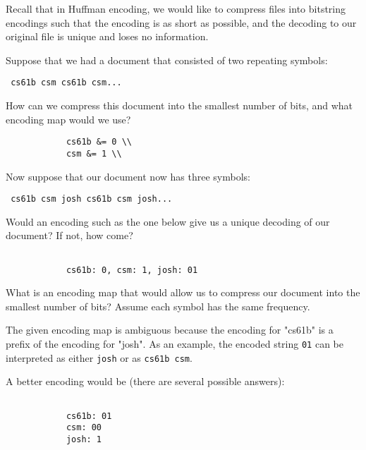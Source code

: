 \question Recall that in Huffman encoding, we would like to compress files into bitstring encodings such that the encoding is as short as possible, and the decoding to our original file is unique and loses no information.

\begin{parts}
    \item Suppose that we had a document that consisted of two repeating symbols:
    
    \lstinline{ cs61b csm cs61b csm...}

    How can we compress this document into the smallest number of bits, and what encoding map would we use?

    \begin{solution}[1in]
        \begin{lstlisting}
            cs61b &= 0 \\
            csm &= 1 \\
        \end{lstlisting}
    \end{solution}

    \item Now suppose that our document now has three symbols:

    \lstinline{ cs61b csm josh cs61b csm josh...}

    Would an encoding such as the one below give us a unique decoding of our document? If not, how come?

    \begin{lstlisting}
     
            cs61b: 0, csm: 1, josh: 01
    \end{lstlisting}
    What is an encoding map that would allow us to compress our document into the smallest number of bits? Assume each symbol has the same frequency.

    \begin{solution}[2in]
        The given encoding map is ambiguous because the encoding for "cs61b" is a prefix of the encoding for "josh". As an example, the encoded string \lstinline{01} can be interpreted as either \lstinline{josh} or as \lstinline{cs61b csm}.

        A better encoding would be (there are several possible answers):
        \begin{lstlisting}
     
            cs61b: 01
            csm: 00
            josh: 1
        \end{lstlisting}
    \end{solution}


\end{parts}

